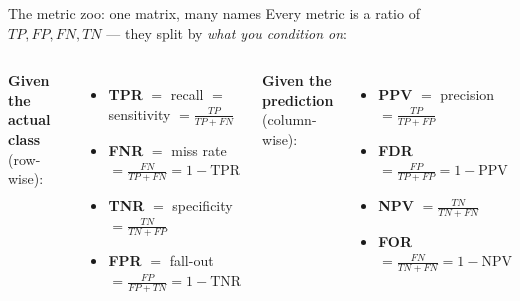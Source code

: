 \documentclass[aspectratio=169]{beamer}
\begin{document}
\begin{frame}{The metric zoo: one matrix, many names}
  Every metric is a ratio of $TP, FP, FN, TN$ --- they split by \emph{what you condition on}:
  \vskip 4pt
  \begin{columns}[T]
    \textbf{Given the actual class} (row-wise):
    \begin{itemize}\small
      \item \textbf{TPR} $=$ recall $=$ sensitivity $= \frac{TP}{TP+FN}$
      \item \textbf{FNR} $=$ miss rate $= \frac{FN}{TP+FN} = 1-\text{TPR}$
      \item \textbf{TNR} $=$ specificity $= \frac{TN}{TN+FP}$
      \item \textbf{FPR} $=$ fall-out $= \frac{FP}{FP+TN} = 1-\text{TNR}$
    \end{itemize}
    \textbf{Given the prediction} (column-wise):
    \begin{itemize}\small
      \item \textbf{PPV} $=$ precision $= \frac{TP}{TP+FP}$
      \item \textbf{FDR} $= \frac{FP}{TP+FP} = 1-\text{PPV}$
      \item \textbf{NPV} $= \frac{TN}{TN+FN}$
      \item \textbf{FOR} $= \frac{FN}{TN+FN} = 1-\text{NPV}$
    \end{itemize}
  \end{columns}
  \vfill
\end{frame}
\end{document}

